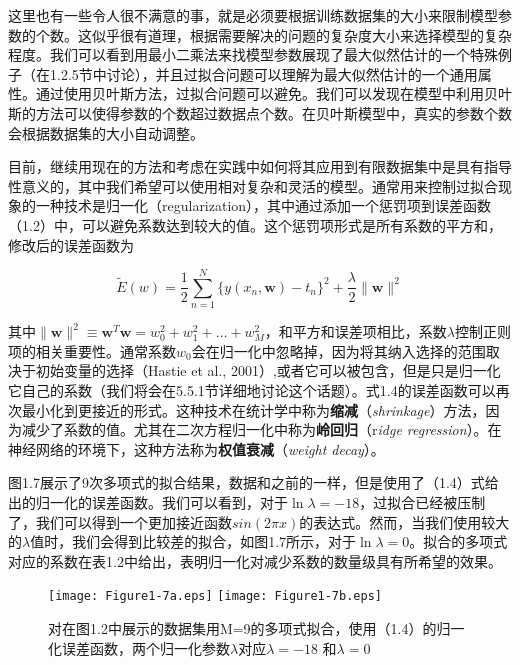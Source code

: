 	这里也有一些令人很不满意的事，就是必须要根据训练数据集的大小来限制模型参数的个数。这似乎很有道理，根据需要解决的问题的复杂度大小来选择模型的复杂程度。我们可以看到用最小二乘法来找模型参数展现了最大似然估计的一个特殊例子（在1.2.5节中讨论），并且过拟合问题可以理解为最大似然估计的一个通用属性。通过使用贝叶斯方法，过拟合问题可以避免。我们可以发现在模型中利用贝叶斯的方法可以使得参数的个数超过数据点个数。在贝叶斯模型中，真实的参数个数会根据数据集的大小自动调整。
	
	目前，继续用现在的方法和考虑在实践中如何将其应用到有限数据集中是具有指导性意义的，其中我们希望可以使用相对复杂和灵活的模型。通常用来控制过拟合现象的一种技术是归一化（regularization），其中通过添加一个惩罚项到误差函数（1.2）中，可以避免系数达到较大的值。这个惩罚项形式是所有系数的平方和，修改后的误差函数为
	
	\begin{equation}
	\tilde{E}(w) = \frac{1}{2} \sum_{n = 1}^{N}\{ y(x_n,\mathbf{w}) - t_n\}^2 + \frac{\lambda}{2} \parallel \mathbf{w} \parallel^2
	\end{equation}
	
	其中$\parallel \mathbf{w} \parallel^2 \equiv \mathbf{w}^T\mathbf{w} = w_0^2 + w_1^2 + \dots +w_M^2 $，和平方和误差项相比，系数$\lambda$控制正则项的相关重要性。通常系数$w_0$会在归一化中忽略掉，因为将其纳入选择的范围取决于初始变量的选择（Hastie et al., 2001）,或者它可以被包含，但是只是归一化它自己的系数（我们将会在5.5.1节详细地讨论这个话题）。式1.4的误差函数可以再次最小化到更接近的形式。这种技术在统计学中称为\textbf{缩减}（\textit{shrinkage}）方法，因为减少了系数的值。尤其在二次方程归一化中称为\textbf{岭回归}（r\textit{idge regression}）。在神经网络的环境下，这种方法称为\textbf{权值衰减}（\textit{weight decay}）。
	
	图1.7展示了9次多项式的拟合结果，数据和之前的一样，但是使用了（1.4）式给出的归一化的误差函数。我们可以看到，对于$\ln \lambda = -18$，过拟合已经被压制了，我们可以得到一个更加接近函数$sin(2 \pi x)$的表达式。然而，当我们使用较大的$\lambda$值时，我们会得到比较差的拟合，如图1.7所示，对于$\ln \lambda = 0$。拟合的多项式对应的系数在表1.2中给出，表明归一化对减少系数的数量级具有所希望的效果。
	
	\begin{figure}
		
		\texttt{[image: Figure1-7a.eps]}
		\texttt{[image: Figure1-7b.eps]}
		
		\caption{对在图1.2中展示的数据集用M=9的多项式拟合，使用（1.4）的归一化误差函数，两个归一化参数$\lambda$对应$\lambda = -18$ 和$\lambda = 0$} 
		\label{fig:endb-flow} 
	\end{figure}
	
